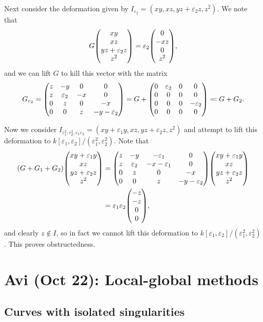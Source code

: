 \documentclass[leqno, openany]{memoir}
\theoremstyle{definition}
\theoremstyle{remark}
\theoremstyle{plain}
\theoremstyle{definition}
\theoremstyle{remark}
\newcommand{\ep}{\varepsilon}
\begin{document}
Next consider the deformation given by $I_{\ep_2} = (xy, xz, yz+\ep_2 z, z^2)$. We note that
\[ G \mqty(xy \\ xz \\ yz + \ep_2 z \\ z^2) = \ep_2 \mqty(0 \\ -xz \\ 0 \\ z^2), \]
and we can lift $G$ to kill this vector with the matrix
\[ G_{\ep_2} = \mqty(z & -y & 0 & 0 \\ z & \ep_2 & -x & 0 \\ 0 & z & 0 & -x \\ 0 & 0 & z & -y - \ep_2) = G + \mqty(0 & \ep_2 & 0 & 0 \\ 0 & 0 & 0 & 0 \\ 0 & 0 & 0 & -\ep_2 \\ 0 & 0 & 0 & 0) \eqqcolon G + G_2. \]

Now we consider $I_{\ep_1^2, \ep_2^2, \ep_1\ep_2} = (xy+\ep_1 y, xz, yz + \ep_2 z, z^2)$ and attempt to lift this deformation to $k[\ep_1, \ep_2]/(\ep_1^2, \ep_2^2)$. Note that 
\begin{align*} 
    (G + G_1 + G_2) \mqty(xy+\ep_1 y \\ xz \\ yz+\ep_2 z \\ z^2) &= \mqty(z & -y & -\ep_1 & 0 \\ z & \ep_2 & -x-\ep_1 & 0 \\ 0 & z & 0 & -x \\ 0 & 0 & z & -y - \ep_2) \mqty(xy+\ep_1 y \\ xz \\ yz+\ep_2 z \\ z^2) \\
    &= \ep_1 \ep_2 \mqty(-z \\ -z \\ 0 \\ 0),
\end{align*}
and clearly $z \notin I$, so in fact we cannot lift this deformation to $k[\ep_1, \ep_2]/(\ep_1^2, \ep_2^2)$. This proves obstructedness.

\chapter{Avi (Oct 22): Local-global methods}%
\label{cha:avi_oct_22_local_global_methods}

\section{Curves with isolated singularities}%
\label{sec:curves_with_isolated_singularities}
\end{document}

